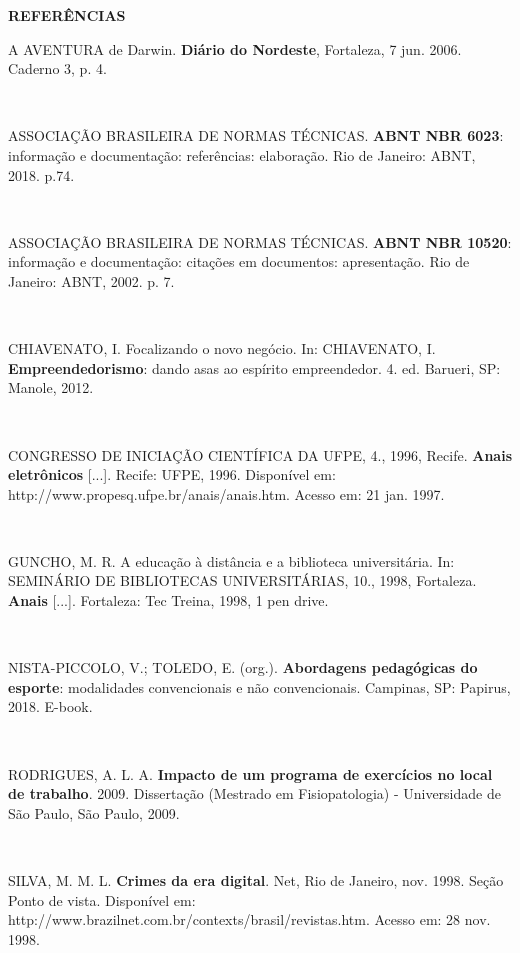 \documentclass[12pt]{article}
\begin{document}
\vspace{2ex}



\begin{center}
	\textbf{REFERÊNCIAS}
\end{center}


\begin{flushleft}
A AVENTURA de Darwin. \textbf{Diário do Nordeste}, Fortaleza, 7 jun. 2006. Caderno 3, p. 4.
	
\

ASSOCIAÇÃO BRASILEIRA DE NORMAS TÉCNICAS. \textbf{ABNT NBR 6023}: informação e documentação: referências: elaboração. Rio de Janeiro: ABNT, 2018.  p.74.

\

ASSOCIAÇÃO BRASILEIRA DE NORMAS TÉCNICAS. \textbf{ABNT NBR 10520}: informação e  documentação: citações em documentos: apresentação. Rio de Janeiro: ABNT, 2002. p. 7.

\


CHIAVENATO, I. Focalizando o novo negócio. In: CHIAVENATO, I. \textbf{Empreendedorismo}: dando asas ao espírito empreendedor. 4. ed. Barueri, SP: Manole, 2012.

\

CONGRESSO DE INICIAÇÃO CIENTÍFICA DA UFPE, 4., 1996, Recife. \textbf{Anais eletrônicos} [...]. Recife: UFPE, 1996. Disponível em: http://www.propesq.ufpe.br/anais/anais.htm. Acesso em: 21 jan. 1997.

\

GUNCHO, M. R. A educação à distância e a biblioteca universitária. In: SEMINÁRIO DE BIBLIOTECAS UNIVERSITÁRIAS, 10., 1998, Fortaleza. \textbf{Anais} [...]. Fortaleza: Tec Treina, 1998, 1 pen drive.

\

NISTA-PICCOLO, V.; TOLEDO, E. (org.). \textbf{Abordagens pedagógicas do esporte}: modalidades convencionais e não convencionais. Campinas, SP: Papirus, 2018. E-book.

\

RODRIGUES, A. L. A. \textbf{Impacto de um programa de exercícios no local de trabalho}. 2009. Dissertação (Mestrado em Fisiopatologia) - Universidade de São Paulo, São Paulo, 2009.

\


SILVA, M. M. L. \textbf{Crimes da era digital}. Net, Rio de Janeiro, nov. 1998. Seção Ponto de vista. Disponível em: http://www.brazilnet.com.br/contexts/brasil/revistas.htm. Acesso em: 28 nov. 1998.
 

\end{flushleft}
\end{document}
